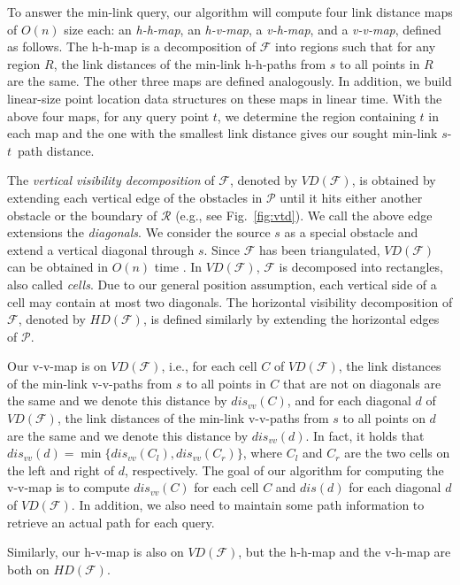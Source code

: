 \documentclass[english,runningheads,11pt]{llncs-revised}
\def\calP{\mathcal{P}}
\def\calR{\mathcal{R}}
\def\calF{\mathcal{F}}
\def\st{$s$-$t$}
\newcommand{\vtd}{\mbox{$V\!D$}}
\newcommand{\htd}{\mbox{$H\!D$}}
\begin{document}
To answer the min-link query, our algorithm will compute four link
distance maps of $O(n)$ size each: an {\em  h-h-map}, an {\em h-v-map}, a {\em v-h-map},
and a {\em v-v-map}, defined as follows. The h-h-map is a
decomposition of $\calF$ into regions such that for any region $R$,
the link distances of the min-link h-h-paths from $s$ to all points in
$R$ are the same. The other three maps are defined analogously.
In addition, we build linear-size point location data structures
\cite{ref:EdelsbrunnerOp86,ref:KirkpatrickOp83} on these maps in linear
time.  With the above four maps, for any query point $t$, we determine the region
containing $t$ in each map and the one
with the smallest link distance gives our sought min-link \st\ path
distance.

The {\em vertical visibility decomposition} of $\calF$, denoted by
$\vtd(\calF)$,
is obtained by extending each vertical edge of the obstacles in
$\calP$ until it hits either another obstacle or
the boundary of $\calR$ (e.g., see Fig.~\ref{fig:vtd}).
We call the above edge extensions the {\em diagonals}.
We consider the source $s$ as a special obstacle and extend a vertical diagonal
through $s$.
Since $\calF$ has been triangulated,  $\vtd(\calF)$ can be obtained in
$O(n)$ time \cite{ref:Bar-YehudaTr94,ref:ChazelleTr91,ref:ChazelleTr84,ref:FournierTr84}.
In $\vtd(\calF)$, $\calF$ is decomposed into rectangles,
also called {\em cells}. Due to our general position
assumption, each vertical side of a cell may contain at most two diagonals.
The horizontal visibility decomposition of $\calF$, denoted by $\htd(\calF)$, is
defined similarly by extending the horizontal edges of $\calP$.

Our v-v-map is on $\vtd(\calF)$, i.e., for each cell $C$ of
$\vtd(\calF)$, the
link distances of the min-link v-v-paths from $s$ to all points in $C$
that are not on diagonals
are the same and we denote this distance by $dis_{vv}(C)$, and for
each diagonal $d$ of $\vtd(\calF)$, the
link distances of the min-link v-v-paths from $s$ to all points on $d$
are the same and we denote this distance by $dis_{vv}(d)$. In fact, it holds that $dis_{vv}(d)=\min\{dis_{vv}(C_l), dis_{vv}(C_r)\}$,
where $C_l$ and $C_r$ are the two cells on the left and right of $d$,
respectively.
The goal of our algorithm for computing the v-v-map is to compute
$dis_{vv}(C)$ for each cell $C$ and $dis(d)$ for each
diagonal $d$ of $\vtd(\calF)$.  In
addition, we also need to maintain some path information to retrieve
an actual path for each query.

Similarly, our h-v-map is also on $\vtd(\calF)$, but the h-h-map and the v-h-map
are both on $\htd(\calF)$.
\end{document}
